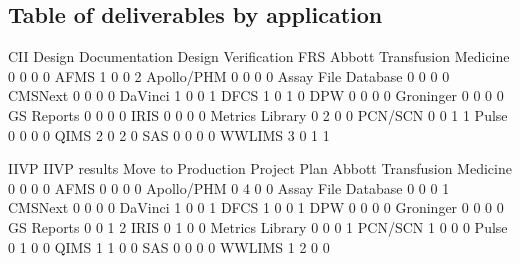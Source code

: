 \documentclass{article}
\begin{document}
\subsection{Table of deliverables by application}
\begin{Schunk}
\begin{Soutput}
                              CII Design Documentation Design Verification FRS
  Abbott Transfusion Medicine   0                    0                   0   0
  AFMS                          1                    0                   0   2
  Apollo/PHM                    0                    0                   0   0
  Assay File Database           0                    0                   0   0
  CMSNext                       0                    0                   0   0
  DaVinci                       1                    0                   0   1
  DFCS                          1                    0                   1   0
  DPW                           0                    0                   0   0
  Groninger                     0                    0                   0   0
  GS Reports                    0                    0                   0   0
  IRIS                          0                    0                   0   0
  Metrics Library               0                    2                   0   0
  PCN/SCN                       0                    0                   1   1
  Pulse                         0                    0                   0   0
  QIMS                          2                    0                   2   0
  SAS                           0                    0                   0   0
  WWLIMS                        3                    0                   1   1
                             
                              IIVP IIVP results Move to Production Project Plan
  Abbott Transfusion Medicine    0            0                  0            0
  AFMS                           0            0                  0            0
  Apollo/PHM                     0            4                  0            0
  Assay File Database            0            0                  0            1
  CMSNext                        0            0                  0            0
  DaVinci                        1            0                  0            1
  DFCS                           1            0                  0            1
  DPW                            0            0                  0            0
  Groninger                      0            0                  0            0
  GS Reports                     0            0                  1            2
  IRIS                           0            1                  0            0
  Metrics Library                0            0                  0            1
  PCN/SCN                        1            0                  0            0
  Pulse                          0            1                  0            0
  QIMS                           1            1                  0            0
  SAS                            0            0                  0            0
  WWLIMS                         1            2                  0            0
                             

\end{Soutput}
\end{Schunk}
\end{document}
